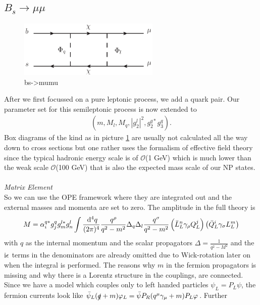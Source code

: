\subsection{$B_s\rightarrow \mu\mu$}
\begin{figure}[t]
 \includegraphics[width=0.6\textwidth]{../pics/bsmumu.eps}
 \caption{bs->mumu}
 \label{pic_Bsmumu}
\end{figure}
After we first focussed on a pure leptonic process, we add a quark pair. Our parameter set for this semileptonic process is now extended to
\begin{align}
 \left(m, M_l, M_q, |g_2^l|^2, g_2^{q*} g_3^q\right).
\end{align}
Box diagrams of the kind as in picture \ref{pic_Bsmumu} are usually not calculated 
all the way down to cross sections but one rather uses the formalism of effective field theory since the typical hadronic energy scale is of
$\mathcal{O}$(1 GeV) which is much lower than the weak scale $\mathcal{O}$(100 GeV) that is also the expected mass scale of our NP states. 
\\ \\ \noindent \textit{Matrix Element}\\
\noindent So we can use 
the OPE framework where they are integrated out and the external masses and momenta are set to zero. The amplitude in the full theory is
\begin{align}
 M =\alpha_i^{q*} g_j^{q} g_m^{l*} g_n^l\int \frac{\; \mathrm{d}^4 q}{(2\pi)^4} \frac{q^\rho}{q^2-m^2}\Delta_q \Delta_l \frac{q^\sigma}{q^2-m^2} \left(\bar L_L^n \gamma_\rho Q_L^j\right) \left(\bar Q_L^i \gamma_\sigma L_L^m\right)
 \label{eq_matElemBSmumu}
\end{align}
with $q$ as the internal momentum and the scalar propagators $\Delta = \frac{1}{q^2-M^2}$ and the $\text{i}\epsilon$ terms in the denominators are already omitted
due to Wick-rotation later on when the integral is performed. The reasons why $m$ in the fermion propagators is missing
and why there is a Lorentz structure in the couplings, are connected. Since we have a model which couples only to left handed particles $\psi_L = P_L \psi$,
the fermion currents look like $\bar \psi_L (\slashed{q}+m)\varphi_L = \bar \psi P_R (q^\mu \gamma_\mu+m) P_L\varphi$. Further
